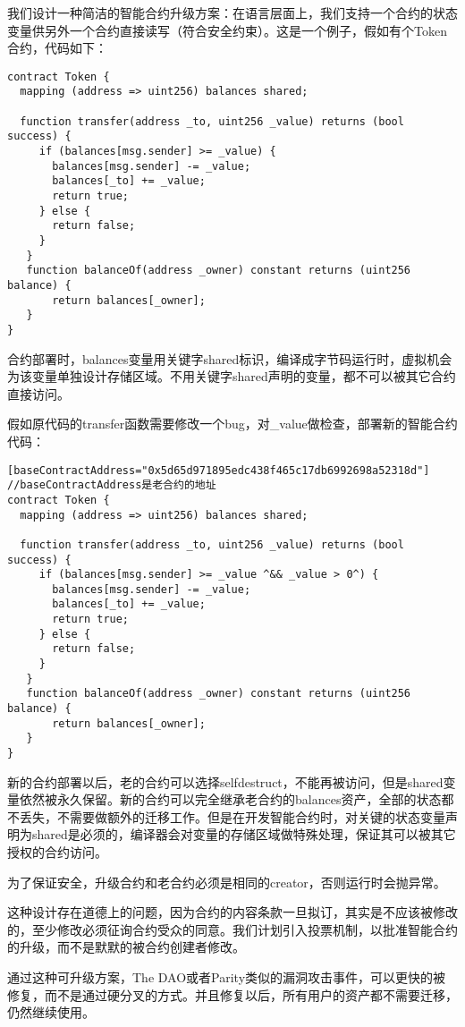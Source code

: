 我们设计一种简洁的智能合约升级方案：在语言层面上，我们支持一个合约的状态变量供另外一个合约直接读写（符合安全约束）。这是一个例子，假如有个Token合约，代码如下：\\

\begin{lstlisting}[frame=single]
contract Token {
  mapping (address => uint256) balances shared;

  function transfer(address _to, uint256 _value) returns (bool success) {
     if (balances[msg.sender] >= _value) {
       balances[msg.sender] -= _value;
       balances[_to] += _value;
       return true;
     } else {
       return false;
     }
   }
   function balanceOf(address _owner) constant returns (uint256 balance) {
       return balances[_owner];
   }
}
\end{lstlisting}

合约部署时，balances变量用关键字shared标识，编译成字节码运行时，虚拟机会为该变量单独设计存储区域。不用关键字shared声明的变量，都不可以被其它合约直接访问。

假如原代码的transfer函数需要修改一个bug，对\_value做检查，部署新的智能合约代码：\\

  
\begin{lstlisting}[frame=single]
[baseContractAddress="0x5d65d971895edc438f465c17db6992698a52318d"]
//baseContractAddress是老合约的地址
contract Token {
  mapping (address => uint256) balances shared;

  function transfer(address _to, uint256 _value) returns (bool success) {
     if (balances[msg.sender] >= _value ^&& _value > 0^) {
       balances[msg.sender] -= _value;
       balances[_to] += _value;
       return true;
     } else {
       return false;
     }
   }
   function balanceOf(address _owner) constant returns (uint256 balance) {
       return balances[_owner];
   }
}
\end{lstlisting}

新的合约部署以后，老的合约可以选择selfdestruct，不能再被访问，但是shared变量依然被永久保留。新的合约可以完全继承老合约的balances资产，全部的状态都不丢失，不需要做额外的迁移工作。但是在开发智能合约时，对关键的状态变量声明为shared是必须的，编译器会对变量的存储区域做特殊处理，保证其可以被其它授权的合约访问。

为了保证安全，升级合约和老合约必须是相同的creator，否则运行时会抛异常。

这种设计存在道德上的问题，因为合约的内容条款一旦拟订，其实是不应该被修改的，至少修改必须征询合约受众的同意。我们计划引入投票机制，以批准智能合约的升级，而不是默默的被合约创建者修改。

通过这种可升级方案，The DAO或者Parity类似的漏洞攻击事件，可以更快的被修复，而不是通过硬分叉的方式。并且修复以后，所有用户的资产都不需要迁移，仍然继续使用。


